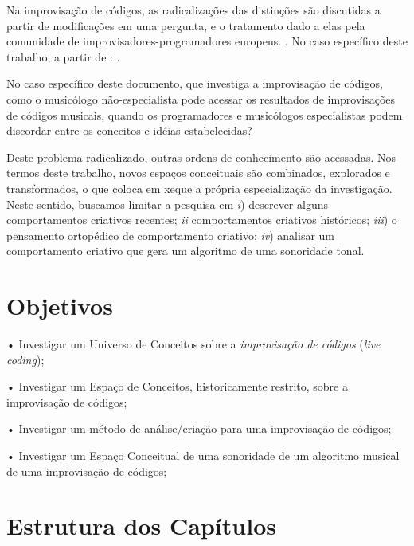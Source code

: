 Na improvisação de códigos, as radicalizações das distinções são discutidas a partir de modificações em uma pergunta, e o tratamento dado a elas pela comunidade de improvisadores-programadores europeus. \cite{pressing_improvisation_1987}. No caso específico deste trabalho, a partir de : . 

No caso específico deste documento, que investiga a improvisação de códigos, como o musicólogo não-especialista pode acessar os resultados de improvisações de códigos musicais, quando os programadores e musicólogos especialistas podem discordar entre os conceitos e idéias estabelecidas? 

Deste problema radicalizado, outras ordens de conhecimento são acessadas. Nos termos deste trabalho, novos espaços conceituais são combinados, explorados e transformados, o que coloca em xeque a própria especialização da investigação. Neste sentido, buscamos limitar a pesquisa em \emph{i}) descrever alguns comportamentos criativos recentes; \emph{ii} comportamentos criativos históricos; \emph{iii}) o pensamento ortopédico de comportamento criativo; \emph{iv}) analisar um comportamento criativo que gera um algoritmo de uma sonoridade tonal. 

\section*{Objetivos}\label{sec:objetivos}

• Investigar um Universo de Conceitos sobre a \emph{improvisação de códigos} (\emph{live coding});

• Investigar um Espaço de Conceitos, historicamente restrito, sobre a improvisação de códigos;

• Investigar um método de análise/criação para uma improvisação de códigos;

• Investigar um Espaço Conceitual de uma sonoridade de um algoritmo musical de uma improvisação de códigos;

\section*{Estrutura dos Capítulos}


